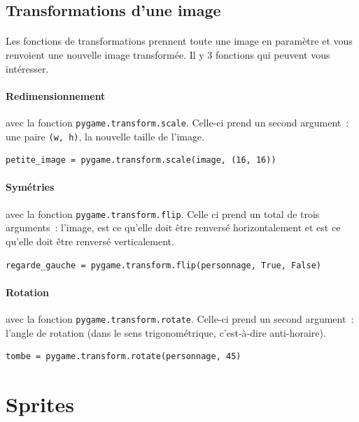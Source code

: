 \subsection{Transformations d'une image}
\label{sec:transform}

\paragraph{}
Les fonctions de transformations prennent toute une image en paramètre et vous renvoient une nouvelle image transformée.
Il y 3 fonctions qui peuvent vous intéresser.

\paragraph{Redimensionnement} avec la fonction \texttt{pygame.transform.scale}.
Celle-ci prend un second argument~: une paire \texttt{(w, h)}, la nouvelle taille de l'image.
\begin{verbatim}
petite_image = pygame.transform.scale(image, (16, 16))
\end{verbatim}

\paragraph{Symétries} avec la fonction \texttt{pygame.transform.flip}.
Celle ci prend un total de trois arguments~: l'image, est ce qu'elle doit être renversé horizontalement et est ce qu'elle doit être renversé verticalement.
\begin{verbatim}
regarde_gauche = pygame.transform.flip(personnage, True, False)
\end{verbatim}

\paragraph{Rotation} avec la fonction \texttt{pygame.transform.rotate}.
Celle-ci prend un second argument~: l'angle de rotation (dans le sens trigonométrique, c'est-à-dire anti-horaire).
\begin{verbatim}
tombe = pygame.transform.rotate(personnage, 45)
\end{verbatim}

\appendix

\section{Sprites}
\label{sec:sprites}

